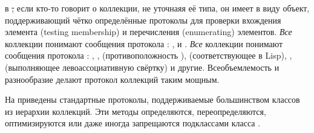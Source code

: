 \documentclass[a4paper,10pt,twoside]{book}
\begin{document}
в \st, если кто-то говорит о коллекции, не уточнаяя её типа, он имеет в виду объект, поддерживающий чётко определённые протоколы для проверки вхождения элемента (testing membership) и перечисления (enumerating) элементов. \emph{Все} коллекции понимают сообщения протокола : \mbox{,}  и \mbox{.} \emph{Все} коллекции понимают сообщения протокола : , ,  (противоположность ),  (соответствующее  в Lisp), ,  (выполняющее левоассоциативную свёртку) и другие.
Всеобъемлемость и разнообразие делают протокол коллекций таким мощным.

На  приведены стандартные протоколы, поддерживаемые большинством классов из иерархии коллекций.
Эти методы определяются, переопределяются, оптимизируются или даже иногда запрещаются подклассами класса .
\end{document}
